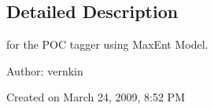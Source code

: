 \subsection{Detailed Description}
for the POC tagger using MaxEnt Model. 

\begin{Desc}
\item[Author:]vernkin\end{Desc}
Created on March 24, 2009, 8:52 PM 